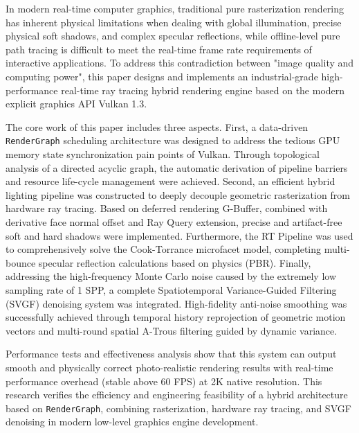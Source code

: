 \newpage
\begin{enabstract}
\thispagestyle{empty}

In modern real-time computer graphics, traditional pure rasterization rendering has inherent physical limitations when dealing with global illumination, precise physical soft shadows, and complex specular reflections, while offline-level pure path tracing is difficult to meet the real-time frame rate requirements of interactive applications. To address this contradiction between "image quality and computing power", this paper designs and implements an industrial-grade high-performance real-time ray tracing hybrid rendering engine based on the modern explicit graphics API Vulkan 1.3.

The core work of this paper includes three aspects. First, a data-driven \texttt{RenderGraph} scheduling architecture was designed to address the tedious GPU memory state synchronization pain points of Vulkan. Through topological analysis of a directed acyclic graph, the automatic derivation of pipeline barriers and resource life-cycle management were achieved. Second, an efficient hybrid lighting pipeline was constructed to deeply decouple geometric rasterization from hardware ray tracing.
 Based on deferred rendering G-Buffer, combined with derivative face normal offset and Ray Query extension, precise and artifact-free soft and hard shadows were implemented. Furthermore, the RT Pipeline was used to comprehensively solve the Cook-Torrance microfacet model, completing multi-bounce specular reflection calculations based on physics (PBR). Finally, addressing the high-frequency Monte Carlo noise caused by the extremely low sampling rate of 1 SPP, a complete Spatiotemporal Variance-Guided Filtering (SVGF) denoising system was integrated. High-fidelity anti-noise smoothing was successfully achieved through temporal history reprojection of geometric motion vectors and multi-round spatial A-Trous filtering guided by dynamic variance.

Performance tests and effectiveness analysis show that this system can output smooth and physically correct photo-realistic rendering results with real-time performance overhead (stable above 60 FPS) at 2K native resolution. This research verifies the efficiency and engineering feasibility of a hybrid architecture based on \texttt{RenderGraph}, combining rasterization, hardware ray tracing, and SVGF denoising in modern low-level graphics engine development.

\end{enabstract}
\par
\vspace*{2em}


\makeatother %